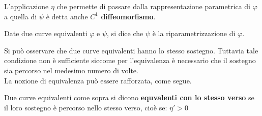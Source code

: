 \begin{definition}
    L'applicazione $\eta$ che permette di passare dalla rappresentazione parametrica di $\varphi$ a quella di $\psi$ è detta anche \textbf{$C^1$ diffeomorfismo}.
\end{definition}
\begin{definition}
    Date due curve equivalenti $\varphi$ e $\psi$, si dice che $\psi$ è la riparametrizzazione di $\varphi$.
\end{definition}
Si può osservare che due curve equivalenti hanno lo stesso sostegno. Tuttavia tale condizione non è sufficiente siccome per l'equivalenza è necessario che il sostegno sia percorso nel medesimo numero di volte.\\
La nozione di equivalenza può essere rafforzata, come segue.
\begin{definition}
    Due curve equivalenti come sopra si dicono \textbf{equvalenti con lo stesso verso} se il loro sostegno è percorso nello stesso verso, cioè se: $\eta'>0$
\end{definition}
